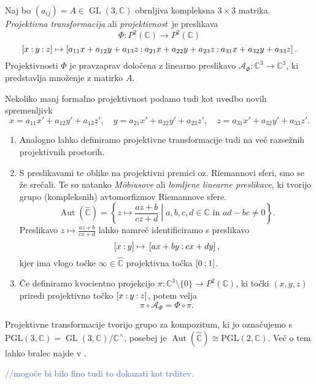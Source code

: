\documentclass[mat1]{fmfdelo}
\numberwithin{equation}{section}
\newcommand{\C}{\mathbb C}
\newcommand{\CM}{\mathbb C ^\times}
\newcommand{\PC}{P^2(\mathbb C)}
\newcommand{\RS}{\widehat{\C}}
\newcommand{\pcoor}[1]{%
\begingroup\lccode`~=`: \lowercase{\endgroup
\edef~}{\mathbin{\mathchar\the\mathcode`:}\nobreak}%
\left[%
\begingroup
\mathcode`:=\string"8000
#1%
\endgroup
\right]%
}
\newcommand{\kom}[1]{
    \textcolor{RoyalBlue}{//#1}
}
\DeclareMathOperator{\GL}{GL}
\DeclareMathOperator{\Aut}{Aut}
\theoremstyle{definition}
\begin{document}
\begin{definicija}
    Naj bo $(a_{ij}) = A \in \GL(3, \C)$ obrnljiva kompleksna $3 \times 3$ matrika. \emph{Projektivna transformacija} ali \emph{projektivnost} je preslikava
        $$\Phi : \PC \to \PC$$
        $$\pcoor{x:y:z} \mapsto \pcoor{a_{11}x + a_{12}y + a_{13}z: a_{21}x + a_{22}y + a_{23}z: a_{31}x + a_{32}y + a_{33}z}.$$
    Projektivnosti $\Phi$ je pravzaprav določena z linearno preslikavo $\mathcal{A}_{\Phi} : \C^3 \to \C^3$, ki predstavlja množenje z matirko $A$.

    Nekoliko manj formalno projektivnost podamo tudi kot uvedbo novih spremenljivk 
    \[
        x = a_{11}x' + a_{12}y' + a_{13}z', \quad y = a_{21}x' + a_{22}y' + a_{23}z', \quad z = a_{31}x' + a_{32}y' + a_{33}z'.  
    \]
\end{definicija}

\begin{opomba}
    \begin{enumerate}
        \item Analogno lahko definiramo projektivne transformacije tudi na več razsežnih projektivnih prostorih. 
        \item
        S preslikavami te oblike na projektivni premici oz. Riemannovi sferi, smo se že srečali. Te so natanko \emph{Möbiusove} ali \emph{lomljene linearne preslikave}, ki tvorijo grupo (kompleksnih) avtomorfizmov Riemannove sfere.
        $$\Aut(\RS) = \left\{ z \mapsto \frac{az + b}{cz +d} \middle\vert a,b,c,d \in \C \text{ in }  ad - bc \neq 0 \right\}.$$
        Preslikavo $z \mapsto \tfrac{az + b}{cx +d}$ lahko namreč identificiramo s preslikavo 
        \[
            \pcoor{x:y} \mapsto \newline \pcoor{ax + by: cx + dy},  
        \]
        kjer ima vlogo točke $\infty \in \RS$ projektivna točka $\pcoor{0:1}$. 
        \item
        Če definiramo kvocientno projekcijo $\pi : \C^3 \setminus \{0\} \to \PC$, ki točki $(x,y,z)$ priredi projektivno točko $\pcoor{x:y:z}$, potem velja 
        $$\pi \circ \mathcal{A}_\Phi = \Phi \circ \pi.$$
    \end{enumerate}
\end{opomba}

Projektivne transformacije tvorijo grupo za kompozitum, ki jo označujemo s $\operatorname{PGL(3, \C)} = \GL(3,\C)/\CM$, posebej je $\Aut(\RS) \cong \operatorname{PGL(2,\C)}$. Več o tem lahko bralec najde v \cite[poglavje 11]{Gibson}.
\kom{mogoče bi bilo fino tudi to dokazati kot trditev.}
\end{document}
